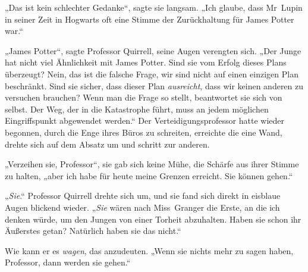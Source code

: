 „Das ist kein schlechter Gedanke“, sagte sie langsam.
„Ich glaube, dass Mr~Lupin in seiner Zeit in Hogwarts oft eine Stimme der Zurückhaltung für James Potter war.“

„James Potter“, sagte Professor Quirrell, seine Augen verengten sich.
„Der Junge hat nicht viel Ähnlichkeit mit James Potter. Sind sie vom Erfolg dieses Plans überzeugt? Nein, das ist die falsche Frage, wir sind nicht auf einen einzigen Plan beschränkt. Sind sie sicher, dass dieser Plan \emph{ausreicht}, dass wir keinen anderen zu versuchen brauchen? Wenn man die Frage so stellt, beantwortet sie sich von selbst. Der Weg, der in die Katastrophe führt, muss an jedem möglichen Eingriffspunkt abgewendet werden.“ Der Verteidigungsprofessor hatte wieder begonnen, durch die Enge ihres Büros zu schreiten, erreichte die eine Wand, drehte sich auf dem Absatz um und schritt zur anderen.

„Verzeihen sie, Professor“, sie gab sich keine Mühe, die Schärfe aus ihrer Stimme zu halten, „aber ich habe für heute meine Grenzen erreicht. Sie können gehen.“

„\emph{Sie}.“ Professor Quirrell drehte sich um, und sie fand sich direkt in eisblaue Augen blickend wieder.
„\emph{Sie} wären nach Miss~Granger die Erste, an die ich denken würde, um den Jungen von einer Torheit abzuhalten. Haben sie schon ihr Äußerstes getan? Natürlich haben sie das nicht.“

Wie kann er es \emph{wagen}, das anzudeuten.
„Wenn sie nichts mehr zu sagen haben, Professor, dann werden sie gehen.“

